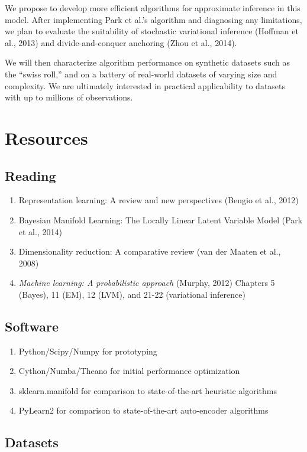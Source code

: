\documentclass{article}
\begin{document}
We propose to develop more efficient algorithms for approximate inference in this model. After implementing Park et al.'s algorithm and diagnosing any limitations, we plan to evaluate the suitability of stochastic variational inference (Hoffman et al., 2013) and divide-and-conquer anchoring (Zhou et al., 2014).

We will then characterize algorithm performance on synthetic datasets such as the ``swiss roll,'' and on a battery of real-world datasets of varying size and complexity. We are ultimately interested in practical applicability to datasets with up to millions of observations.

\section{Resources}
\subsection{Reading}
\begin{enumerate}
\item Representation learning: A review and new perspectives (Bengio et al., 2012) %
\item Bayesian Manifold Learning: The Locally Linear Latent Variable Model (Park et al., 2014)%
\item Dimensionality reduction: A comparative review (van der Maaten et al., 2008)
\item \textit{Machine learning: A probabilistic approach} (Murphy, 2012) Chapters 5 (Bayes), 11 (EM), 12 (LVM), and 21-22 (variational inference)
\end{enumerate}
\subsection{Software}
\begin{enumerate}
\item Python/Scipy/Numpy for prototyping
\item Cython/Numba/Theano for initial performance optimization
\item sklearn.manifold for comparison to state-of-the-art heuristic algorithms
\item PyLearn2 for comparison to state-of-the-art auto-encoder algorithms
\end{enumerate}
\subsection{Datasets}
\end{document}
